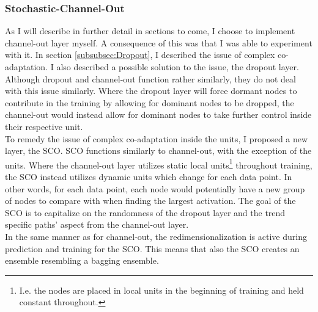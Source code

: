 \subsubsection*{Stochastic-Channel-Out}\label{subsubsec:stochchannelout}
As I will describe in further detail in sections to come, I choose to implement channel-out layer myself. A consequence of this 
was that I was able to experiment with it. In section \ref{subsubsec:Dropout}, I described the issue of complex co-adaptation. I also described 
a possible solution to the issue, the dropout layer. Although dropout and channel-out function rather similarly, they do not deal 
with this issue similarly. Where the dropout layer will force dormant nodes to contribute in the training by allowing for dominant
nodes to be dropped, the channel-out would instead allow for dominant nodes to take further control inside their respective unit.
\\
To remedy the issue of complex co-adaptation inside the units, I proposed a new layer, the \acf{SCO}. \ac{SCO} functions similarly to channel-out, 
with the exception of the units. Where the channel-out layer utilizes static local units\footnote{I.e. the nodes are placed in local units in the beginning of 
training and held constant throughout.} throughout training, the \ac{SCO} instead utilizes dynamic units which change for each data point. In other words, 
for each data point, each node would potentially have a new group of nodes to compare with when finding the largest activation.
The goal of the \ac{SCO} is to capitalize on the randomness of the dropout layer and the trend specific paths' aspect from the 
channel-out layer.
\\  
In the same manner as for channel-out, the redimensionalization is active during prediction and training for the \ac{SCO}. This 
means that also the \ac{SCO} creates an ensemble resembling a bagging ensemble.
